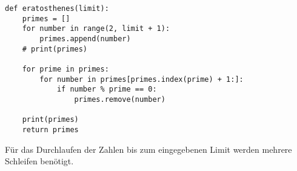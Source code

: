 \vspace{\baselineskip}
\begin{lstlisting}[caption={Funktion: eratosthenes(limit)}, captionpos=b]
def eratosthenes(limit):
    primes = []
    for number in range(2, limit + 1):
        primes.append(number)
    # print(primes)

    for prime in primes:
        for number in primes[primes.index(prime) + 1:]:
            if number % prime == 0:
                primes.remove(number)

    print(primes)
    return primes
\end{lstlisting}
\vspace{\baselineskip}

Für das Durchlaufen der Zahlen bis zum eingegebenen Limit werden mehrere Schleifen benötigt. 

